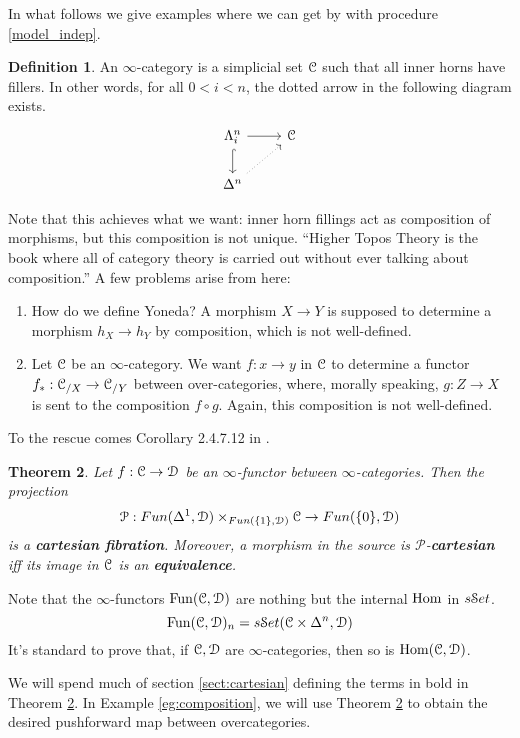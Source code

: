 \documentclass[10pt,a4paper,reqno,oneside]{book} %
\theoremstyle{plain}
\newtheorem{thm}{Theorem}[section]
\theoremstyle{definition}
\newtheorem{defin}[thm]{Definition}
\theoremstyle{remark}
\numberwithin{equation}{section}
\begin{document}
In what follows we give examples where we can get by with procedure \ref{model_indep}. 

\begin{defin}
An $\infty$-category is a simplicial set $\mathcal C$ such that all inner horns have fillers. In other words, for all $0<i<n$,
the dotted arrow in the following diagram exists.
\[
\begin{tikzcd}
\Lambda^{n}_{i}\arrow[hook]{d}\arrow{r} & \cC \\
\Delta^n\arrow[dotted]{ur} & 
\end{tikzcd}
\]
\end{defin}

Note that this achieves what we want: inner horn fillings act as composition of morphisms, but this composition is not unique. 
``Higher Topos Theory \cite{HTT} is the book where all of category theory is carried out without ever talking about composition.'' 
A few problems arise
from here:

\begin{enumerate}
\item How do we define Yoneda? A morphism $X \to Y$ is supposed to determine a morphism $h_X \to h_Y$ by composition, which
is not well-defined.
\item Let $\mathcal C$ be an $\infty$-category. We want $f: x \to y$ in $\mathcal C$ to determine a functor $f_*: \mathcal C_{/X} \to \mathcal C_{/Y}$
between over-categories, where, morally speaking, $g: Z \to X$ is sent to the composition $f \circ g$.
Again, this composition is not well-defined.
\end{enumerate}

To the rescue comes Corollary 2.4.7.12 in \cite{HTT}. 
\begin{thm}
\label{thm:cartesian_fib}
Let $f: \mathcal C \to \mathcal D$ be an $\infty$-functor between $\infty$-categories. Then the projection
\[	\mathcal{P} : Fun(\Delta^1, \mathcal D) \times_{Fun(\{1\},\mathcal D)} \mathcal C \to Fun(\{0\}, \mathcal D) 	\]
is a \textbf{cartesian fibration}. Moreover, a morphism in the source is $\mathcal{P}$-\textbf{cartesian} iff its image in $\mathcal C$ 
is an \textbf{equivalence}.
\end{thm}
Note that the $\infty$-functors $\operatorname{Fun}(\mathcal C,\mathcal D)$ are nothing but the internal $\operatorname{Hom}$ in $s\mathcal S et$. 
\[	\operatorname{Fun}(\mathcal C,\mathcal D)_n = s\mathcal S et(\mathcal C \times \Delta^n, \mathcal D)	\]
It's standard to prove that, if $\mathcal C, \mathcal D$ are $\infty$-categories, then so is $\operatorname{Hom}(\mathcal C, \mathcal D)$.

We will spend much of section \ref{sect:cartesian} defining the terms in bold in Theorem \ref{thm:cartesian_fib}. In Example
\ref{eg:composition}, we will use Theorem \ref{thm:cartesian_fib} to obtain the desired pushforward map between overcategories.
\end{document}
